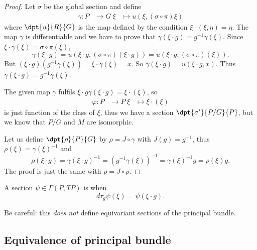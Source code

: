 \begin{proof}
	\subdem{\ref{enuymaii}$\Rightarrow$~\ref{enuymaiii}}
	Let $\sigma$ be the global section and define
	\begin{equation}
		\begin{aligned}
			\gamma \colon P & \to G\
			\xi             & \mapsto u(\xi,(\sigma\circ\pi)\xi)
		\end{aligned}
	\end{equation}
	where $\dpt{u}{R}{G}$ is the map defined by the condition $\xi\cdot(\xi,\eta)=\eta$. The map $\gamma$ is differentiable and we have to prove that $\gamma(\xi\cdot g)=g^{-1}\gamma(\xi)$. Since $\xi\cdot \gamma(\xi)=\sigma\circ\pi(\xi)$,
	\[
		\gamma(\xi\cdot g)=u(\xi\cdot g,(\sigma\circ\pi)(\xi\cdot g))=u(\xi\cdot g,(\sigma\circ\pi)(\xi)).
	\]
	But $(\xi\cdot g)(g^{-1}\gamma(\xi))=\xi\cdot\gamma(\xi)=x$. So $\gamma(\xi\cdot g)=u(\xi\cdot g,x)$. Thus $\gamma(\xi\cdot g)=g^{-1}\gamma(\xi)$.

	\subdem{\ref{enuymaiii}$\Rightarrow$~\ref{enuymaii}}
	The given map $\gamma$ fulfils $\xi\cdot g\gamma(\xi\cdot g)=\xi\cdot(\xi)$, so
	\begin{equation}
		\begin{aligned}
			\varphi \colon P & \to P\
			\xi              & \mapsto \xi\cdot(\xi)
		\end{aligned}
	\end{equation}
	is just function of the class of $\xi$, thus we have a section $\dpt{\sigma'}{P/G}{P}$, but we know that $P/G$ and $M$ are isomorphic.

	\subdem{\ref{enuymaiii}$\Rightarrow$~\ref{enuymaiv}}
	Let us define $\dpt{\rho}{P}{G}$ by $\rho=J\circ\gamma$ with $J(g)=g^{-1}$, thus $\rho(\xi)=\gamma(\xi)^{-1}$ and
	\[
		\rho(\xi\cdot g)=\gamma(\xi\cdot g)^{-1}=(g^{-1}\gamma(\xi))^{-1}=\gamma(\xi)^{-1} g=\rho(\xi)g.
	\]
	\subdem{\ref{enuymaiv}$\Rightarrow$~\ref{enuymaiii}} The proof is just the same with $\rho=J\circ\rho$.
\end{proof}

\begin{definition}
	A section $\psi\in\Gamma(P,TP)$ is  when
	\[
		d\tau_{g}\psi(\xi)=\psi(\xi\cdot g).
	\]
	\label{DefEqVectPrinc}
\end{definition}
Be careful: this \emph{does not} define equivariant sections of the principal bundle.
\subsection{Equivalence of principal bundle}

